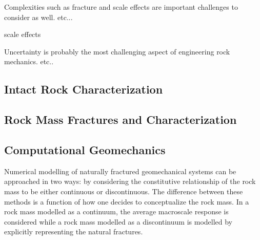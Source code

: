 Complexities such as fracture and scale effects are important challenges to consider as well. etc...\

scale effects

Uncertainty is probably the most challenging aspect of engineering rock mechanics. etc..

\subsection{Intact Rock Characterization}

\subsection{Rock Mass Fractures and Characterization}

\subsection{Computational Geomechanics}

Numerical modelling of naturally fractured geomechanical systems can be approached in two ways: by considering the constitutive relationship of the rock mass to be either continuous or discontinuous. The difference between these methods is a function of how one decides to conceptualize the rock mass. In a rock mass modelled as a continuum, the average macroscale response is considered while a rock mass modelled as a discontinuum is modelled by explicitly representing the natural fractures. 